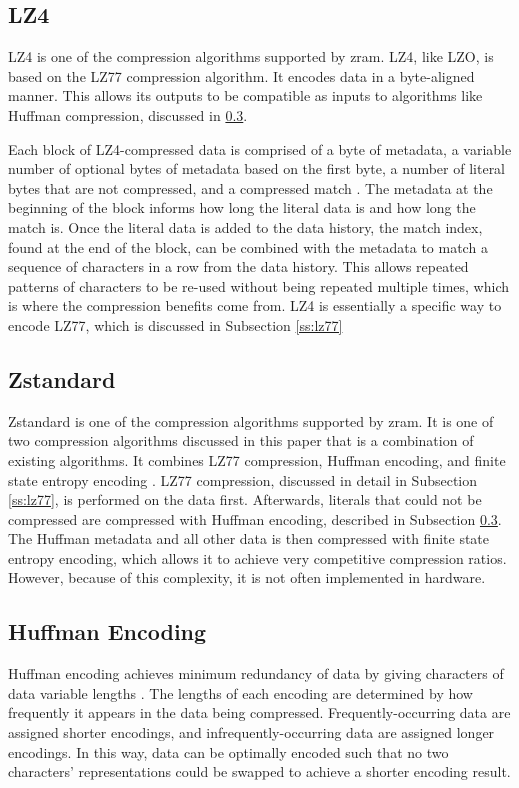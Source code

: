 \documentclass[doublespace,nopageskip]{VTthesis}
\begin{document}
\subsection{LZ4}\label{ss:lz4}
LZ4 is one of the compression algorithms supported by zram. LZ4, like LZO, is based on the LZ77 compression algorithm. It encodes data in a byte-aligned manner. This allows its outputs to be compatible as inputs to algorithms like Huffman compression, discussed in \ref{ss:huffman_encoding}.

Each block of LZ4-compressed data is comprised of a byte of metadata, a variable number of optional bytes of metadata based on the first byte, a number of literal bytes that are not compressed, and a compressed match \cite{lz4}. The metadata at the beginning of the block informs how long the literal data is and how long the match is. Once the literal data is added to the data history, the match index, found at the end of the block, can be combined with the metadata to match a sequence of characters in a row from the data history. This allows repeated patterns of characters to be re-used without being repeated multiple times, which is where the compression benefits come from. LZ4 is essentially a specific way to encode LZ77, which is discussed in Subsection \ref{ss:lz77}

\subsection{Zstandard}\label{ss:zstandard}
Zstandard is one of the compression algorithms supported by zram. It is one of two compression algorithms discussed in this paper that is a combination of existing algorithms. It combines LZ77 compression, Huffman encoding, and finite state entropy encoding \cite{zstd}. LZ77 compression, discussed in detail in Subsection \ref{ss:lz77}, is performed on the data first. Afterwards, literals that could not be compressed are compressed with Huffman encoding, described in Subsection \ref{ss:huffman_encoding}. The Huffman metadata and all other data is then compressed with finite state entropy encoding, which allows it to achieve very competitive compression ratios. However, because of this complexity, it is not often implemented in hardware. 

\subsection{Huffman Encoding}\label{ss:huffman_encoding}
Huffman encoding achieves minimum redundancy of data by giving characters of data variable lengths \cite{huffman}. The lengths of each encoding are determined by how frequently it appears in the data being compressed. Frequently-occurring data are assigned shorter encodings, and infrequently-occurring data are assigned longer encodings. In this way, data can be optimally encoded such that no two characters' representations could be swapped to achieve a shorter encoding result. 
\end{document}
